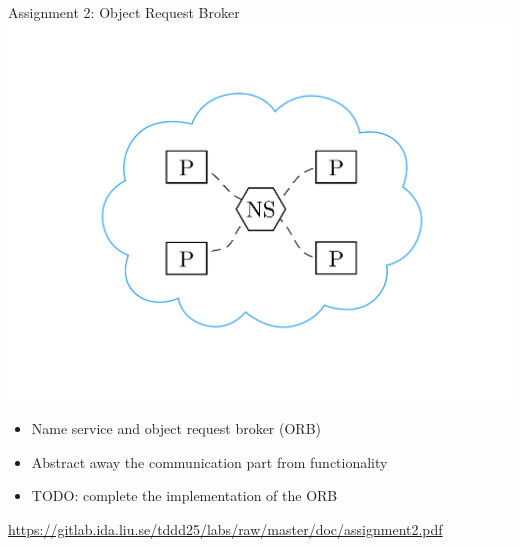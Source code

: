 \documentclass[compress,xcolor=table]{beamer}
\begin{document}
\begin{frame}{Assignment 2: Object Request Broker}
  \centering
  \includegraphics[scale=0.10,page=1]{include/assets/name-service}
  \begin{itemize}
    \item Name service and object request broker (ORB)
    \item Abstract away the communication part from functionality
    \item \alert{TODO}: complete the implementation of the ORB
  \end{itemize}
  \begin{center}
    \scriptsize \url{https://gitlab.ida.liu.se/tddd25/labs/raw/master/doc/assignment2.pdf}
  \end{center}
\end{frame}
\end{document}
